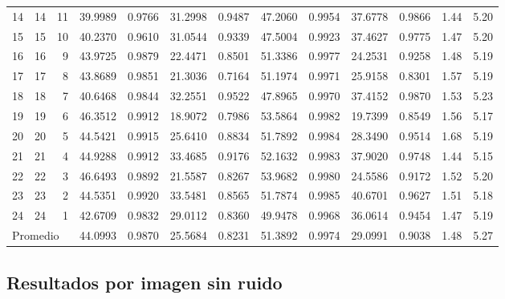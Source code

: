\documentclass[11pt,a4paper]{article}
\begin{document}
\begin{landscape}
{\begin{tabular}{r r r r r r r r r r r r r}
14 & 14 & 11 & 39.9989 & 0.9766 & 31.2998 & 0.9487 & 47.2060 & 0.9954 & 37.6778 & 0.9866 & 1.44 & 5.20 \\
15 & 15 & 10 & 40.2370 & 0.9610 & 31.0544 & 0.9339 & 47.5004 & 0.9923 & 37.4627 & 0.9775 & 1.47 & 5.20 \\
16 & 16 & 9 & 43.9725 & 0.9879 & 22.4471 & 0.8501 & 51.3386 & 0.9977 & 24.2531 & 0.9258 & 1.48 & 5.19 \\
17 & 17 & 8 & 43.8689 & 0.9851 & 21.3036 & 0.7164 & 51.1974 & 0.9971 & 25.9158 & 0.8301 & 1.57 & 5.19 \\
18 & 18 & 7 & 40.6468 & 0.9844 & 32.2551 & 0.9522 & 47.8965 & 0.9970 & 37.4152 & 0.9870 & 1.53 & 5.23 \\
19 & 19 & 6 & 46.3512 & 0.9912 & 18.9072 & 0.7986 & 53.5864 & 0.9982 & 19.7399 & 0.8549 & 1.56 & 5.17 \\
20 & 20 & 5 & 44.5421 & 0.9915 & 25.6410 & 0.8834 & 51.7892 & 0.9984 & 28.3490 & 0.9514 & 1.68 & 5.19 \\
21 & 21 & 4 & 44.9288 & 0.9912 & 33.4685 & 0.9176 & 52.1632 & 0.9983 & 37.9020 & 0.9748 & 1.44 & 5.15 \\
22 & 22 & 3 & 46.6493 & 0.9892 & 21.5587 & 0.8267 & 53.9682 & 0.9980 & 24.5586 & 0.9172 & 1.52 & 5.20 \\
23 & 23 & 2 & 44.5351 & 0.9920 & 33.5481 & 0.8565 & 51.7874 & 0.9985 & 40.6701 & 0.9627 & 1.51 & 5.18 \\
24 & 24 & 1 & 42.6709 & 0.9832 & 29.0112 & 0.8360 & 49.9478 & 0.9968 & 36.0614 & 0.9454 & 1.47 & 5.19 \\
\midrule
\multicolumn{3}{l}{Promedio} & 44.0993 & 0.9870 & 25.5684 & 0.8231 & 51.3892 & 0.9974 & 29.0991 & 0.9038 & 1.48 & 5.27 \\
\bottomrule
\end{tabular}%
}
\end{landscape}

\subsection{Resultados por imagen sin ruido}
\label{app:tabla-sin-ruido}
\end{document}
